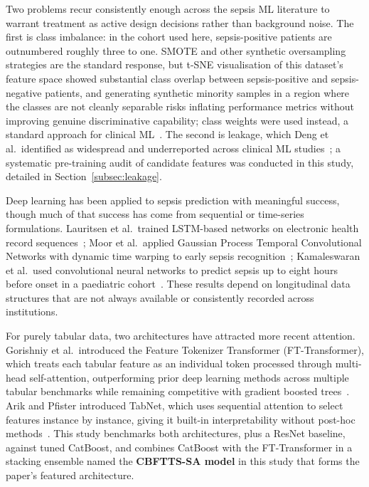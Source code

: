 \documentclass[final,3p,times]{elsarticle}
\begin{document}
Two problems recur consistently enough across the sepsis ML
literature to warrant treatment as active design decisions rather
than background noise. The first is class imbalance: in the cohort
used here, sepsis-positive patients are outnumbered roughly three
to one. SMOTE and other synthetic oversampling strategies are the
standard response, but t-SNE visualisation of this dataset's
feature space showed substantial class overlap between
sepsis-positive and sepsis-negative patients, and generating
synthetic minority samples in a region where the classes are not
cleanly separable risks inflating performance metrics without
improving genuine discriminative capability; class weights were
used instead, a standard approach for clinical
ML~\cite{deng2022}. The second is leakage, which Deng et al.\
identified as widespread and underreported across clinical ML
studies~\cite{deng2022}; a systematic pre-training audit of
candidate features was conducted in this study, detailed in
Section~\ref{subsec:leakage}.

Deep learning has been applied to sepsis prediction with
meaningful success, though much of that success has come from
sequential or time-series formulations. Lauritsen et al.\ trained
LSTM-based networks on electronic health record
sequences~\cite{lauritsen2020}; Moor et al.\ applied Gaussian
Process Temporal Convolutional Networks with dynamic time warping
to early sepsis recognition~\cite{moor2019}; Kamaleswaran et al.\
used convolutional neural networks to predict sepsis up to eight
hours before onset in a paediatric cohort~\cite{kamaleswaran2018}.
These results depend on longitudinal data structures that are not
always available or consistently recorded across institutions.

For purely tabular data, two architectures have attracted more
recent attention. Gorishniy et al.\ introduced the Feature
Tokenizer Transformer (FT-Transformer), which treats each tabular
feature as an individual token processed through multi-head
self-attention, outperforming prior deep learning methods across
multiple tabular benchmarks while remaining competitive with
gradient boosted trees~\cite{gorishniy2021}. Arik and Pfister
introduced TabNet, which uses sequential attention to select
features instance by instance, giving it built-in interpretability
without post-hoc methods~\cite{arik2021}. This study benchmarks
both architectures, plus a ResNet baseline, against tuned CatBoost,
and combines CatBoost with the FT-Transformer in a stacking
ensemble  named the \textbf{CBFTTS-SA model} in this study  that
forms the paper's featured architecture.
\end{document}
